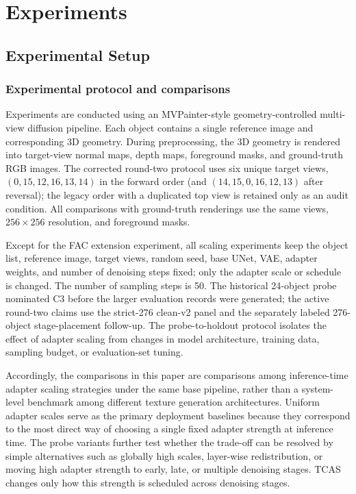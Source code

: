 \documentclass[times,twocolumn,final]{elsarticle}
\begin{document}
\section{Experiments}
\label{sec:experiments}

\subsection{Experimental Setup}
\label{subsec:setup}

\subsubsection{Experimental protocol and comparisons}

Experiments are conducted using an MVPainter-style geometry-controlled multi-view diffusion pipeline. Each object contains a single reference image and corresponding 3D geometry. During preprocessing, the 3D geometry is rendered into target-view normal maps, depth maps, foreground masks, and ground-truth RGB images. The corrected round-two protocol uses six unique target views, $(0,15,12,16,13,14)$ in the forward order (and $(14,15,0,16,12,13)$ after reversal); the legacy order with a duplicated top view is retained only as an audit condition. All comparisons with ground-truth renderings use the same views, $256\times256$ resolution, and foreground masks.

Except for the FAC extension experiment, all scaling experiments keep the object list, reference image, target views, random seed, base UNet, VAE, adapter weights, and number of denoising steps fixed; only the adapter scale or schedule is changed. The number of sampling steps is 50. The historical 24-object probe nominated C3 before the larger evaluation records were generated; the active round-two claims use the strict-276 clean-v2 panel and the separately labeled 276-object stage-placement follow-up. The probe-to-holdout protocol isolates the effect of adapter scaling from changes in model architecture, training data, sampling budget, or evaluation-set tuning.

Accordingly, the comparisons in this paper are comparisons among inference-time adapter scaling strategies under the same base pipeline, rather than a system-level benchmark among different texture generation architectures. Uniform adapter scales serve as the primary deployment baselines because they correspond to the most direct way of choosing a single fixed adapter strength at inference time. The probe variants further test whether the trade-off can be resolved by simple alternatives such as globally high scales, layer-wise redistribution, or moving high adapter strength to early, late, or multiple denoising stages. TCAS changes only how this strength is scheduled across denoising stages.
\end{document}
